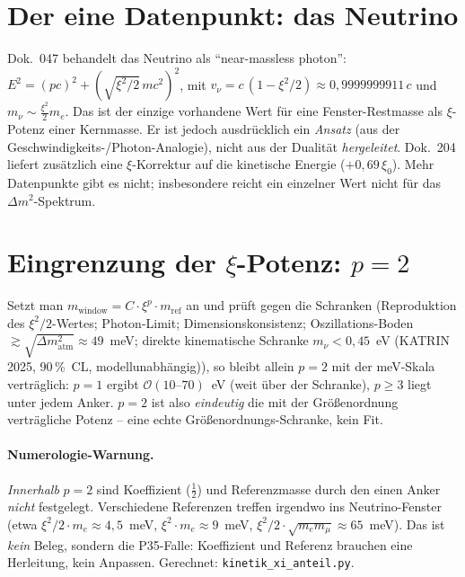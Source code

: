 \section{Der eine Datenpunkt: das Neutrino}
Dok.~047 behandelt das Neutrino als \enquote{near-massless photon}: $E^2=(pc)^2+(\sqrt{\xi^2/2}\,
mc^2)^2$, mit $v_\nu=c\,(1-\xi^2/2)\approx0{,}9999999911\,c$ und $m_\nu\sim\tfrac{\xi^2}{2}m_e$.
Das ist der einzige vorhandene Wert für eine Fenster-Restmasse als $\xi$-Potenz einer Kernmasse.
Er ist jedoch ausdrücklich ein \emph{Ansatz} (aus der Geschwindigkeits-/Photon-Analogie), nicht aus
der Dualität \emph{hergeleitet}. Dok.~204 liefert zusätzlich eine $\xi$-Korrektur auf die kinetische
Energie ($+0{,}69\,\xi_0$). Mehr Datenpunkte gibt es nicht; insbesondere reicht ein einzelner Wert
nicht für das $\Delta m^2$-Spektrum.

\section{Eingrenzung der $\xi$-Potenz: $p=2$}
Setzt man $m_{\text{window}}=C\cdot\xi^p\cdot m_{\text{ref}}$ an und prüft gegen die Schranken
(Reproduktion des $\xi^2/2$-Wertes; Photon-Limit; Dimensionskonsistenz; Oszillations-Boden
$\gtrsim\!\sqrt{\Delta m^2_{\text{atm}}}\approx 49$~meV; direkte kinematische Schranke $m_\nu<0{,}45$~eV (KATRIN 2025, 90\,\%~CL, modellunabhängig)),
so bleibt allein $p=2$ mit der meV-Skala verträglich: $p=1$ ergibt $\mathcal{O}(10\text{--}70)$~eV
(weit über der Schranke), $p\ge3$ liegt unter jedem Anker. $p=2$ ist also \emph{eindeutig} die mit
der Größenordnung verträgliche Potenz -- eine echte Größenordnungs-Schranke, kein Fit.

\paragraph{Numerologie-Warnung.} \emph{Innerhalb} $p=2$ sind Koeffizient ($\tfrac12$) und
Referenzmasse durch den einen Anker \emph{nicht} festgelegt. Verschiedene Referenzen treffen
irgendwo ins Neutrino-Fenster (etwa $\xi^2/2\cdot m_e\approx4{,}5$~meV, $\xi^2\cdot m_e\approx9$~meV,
$\xi^2/2\cdot\sqrt{m_e m_\mu}\approx65$~meV). Das ist \emph{kein} Beleg, sondern die P35-Falle:
Koeffizient und Referenz brauchen eine Herleitung, kein Anpassen. Gerechnet:
\texttt{kinetik\_xi\_anteil.py}.

